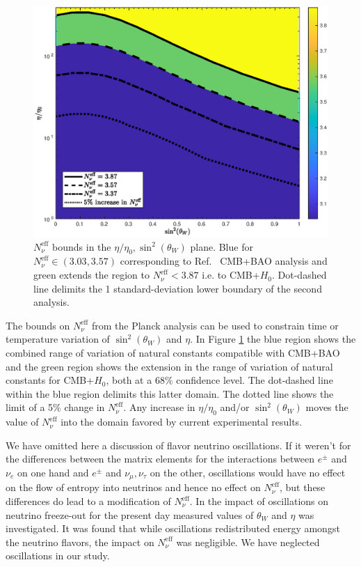 \begin{figure}
\centerline{\includegraphics[width=0.9\columnwidth]{04-birrell/ParametricStudies/Figures/region_plot_legend.eps}
}
\caption{$N_\nu^{\mathrm{eff}}$ bounds in the $\eta/\eta_0, \sin^2(\theta_W)$ plane. Blue for $N_\nu^{\mathrm{eff}}\in (3.03,3.57)$ corresponding to Ref.~\cite{Planck:2013pxb} CMB+BAO analysis and green extends the region to $N_\nu^{\mathrm{eff}}<3.87$ i.e. to CMB+$H_0$. Dot-dashed line delimits the 1 standard-deviation lower boundary of the second analysis. }
\label{N_nu_domain}
 \end{figure}

The bounds on $N_\nu^{\mathrm{eff}}$ from the Planck analysis \cite{Planck:2013pxb} can be  used to constrain time or temperature variation of $\sin^2(\theta_W)$ and $\eta$.  
In  Figure \ref{N_nu_domain} the blue region shows the combined range of  variation of natural constants  compatible with CMB+BAO and the green region shows  the extension in the range of  variation of  natural constants for CMB+$H_0$, both at a $68\%$ confidence level. The dot-dashed line within the blue region delimits   this latter domain. The dotted line shows the limit of a 5\% change in $N_\nu^{\mathrm{eff}}$.    Any increase in  $\eta/\eta_0$ and/or $\sin^2(\theta_W)$ moves the value of $N_\nu^{\mathrm{eff}}$ into the domain favored by current experimental results.

We have omitted here a discussion of flavor neutrino oscillations. If it weren't for the differences between the matrix elements for the interactions between $e^\pm$ and $\nu_e$ on one hand and $e^\pm$ and $\nu_\mu,\nu_\tau$ on the other, oscillations would have no effect on the flow of entropy into neutrinos and hence no effect on $N_\nu^{\mathrm{eff}}$, but these differences do lead to a modification of $N_\nu^{\mathrm{eff}}$.  In \cite{Mangano:2005cc} the impact of oscillations on neutrino freeze-out for the present day measured values of $\theta_W$ and $\eta$ was investigated.  It was found  that while oscillations redistributed energy amongst the neutrino flavors, the impact on $N_\nu^{\mathrm{eff}}$ was negligible. We have neglected oscillations in our study.

